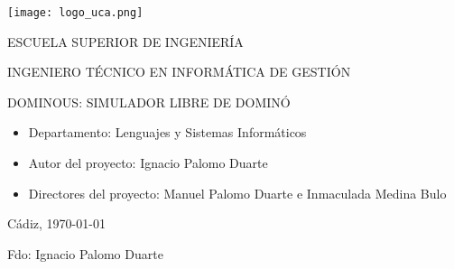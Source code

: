 

\begin{center}

  \texttt{[image: logo\_uca.png]} \\

  \vspace{2.0cm}

  \Large{ESCUELA SUPERIOR DE INGENIERÍA} \\

  \vspace{1.0cm}

  \large{INGENIERO TÉCNICO EN INFORMÁTICA DE GESTIÓN} \\

  \vspace{2.0cm}

  \large{DOMINOUS: SIMULADOR LIBRE DE DOMINÓ} \\

  \vspace{1.0cm}

\end{center}

\begin{itemize}
\item \large{Departamento: Lenguajes y Sistemas Informáticos}
\item \large{Autor del proyecto: Ignacio Palomo Duarte}
\item \large{Directores del proyecto: Manuel Palomo Duarte e Inmaculada Medina Bulo}
\end{itemize}

\vspace{1.0cm}

\begin{flushright}
  \large{Cádiz, \today} \\

  \vspace{2.5cm}

  \large{Fdo: Ignacio Palomo Duarte}
\end{flushright}
